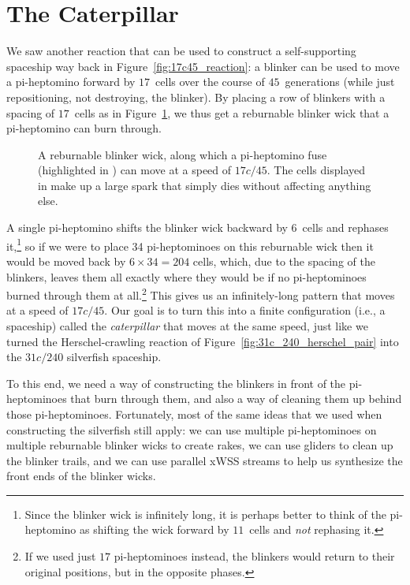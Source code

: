 \section{The Caterpillar}\label{sec:caterpillar}

We saw another reaction that can be used to construct a self-supporting spaceship way back in Figure~\ref{fig:17c45_reaction}: a blinker can be used to move a pi-heptomino forward by $17$~cells over the course of $45$~generations (while just repositioning, not destroying, the blinker). By placing a row of blinkers with a spacing of $17$~cells as in Figure~\ref{fig:reburnable_blinker_wick}, we thus get a reburnable blinker wick that a pi-heptomino can burn through.

\begin{figure}[!htb]
	\centering
	\caption{A reburnable blinker wick, along which a pi-heptomino fuse (highlighted in ) can move at a speed of $17c/45$. The cells displayed in  make up a large spark that simply dies without affecting anything else.}\label{fig:reburnable_blinker_wick}
\end{figure}

A single pi-heptomino shifts the blinker wick backward by $6$~cells and rephases it,\footnote{Since the blinker wick is infinitely long, it is perhaps better to think of the pi-heptomino as shifting the wick forward by $11$~cells and \emph{not} rephasing it.} so if we were to place 34 pi-heptominoes on this reburnable wick then it would be moved back by $6 \times 34 = 204$ cells, which, due to the spacing of the blinkers, leaves them all exactly where they would be if no pi-heptominoes burned through them at all.\footnote{If we used just $17$ pi-heptominoes instead, the blinkers would return to their original positions, but in the opposite phases.} This gives us an infinitely-long pattern that moves at a speed of $17c/45$. Our goal is to turn this into a finite configuration (i.e., a spaceship) called the \emph{caterpillar} that moves at the same speed, just like we turned the Herschel-crawling reaction of Figure~\ref{fig:31c_240_herschel_pair} into the $31c/240$ silverfish spaceship.

To this end, we need a way of constructing the blinkers in front of the pi-heptominoes that burn through them, and also a way of cleaning them up behind those pi-heptominoes. Fortunately, most of the same ideas that we used when constructing the silverfish still apply: we can use multiple pi-heptominoes on multiple reburnable blinker wicks to create rakes, we can use gliders to clean up the blinker trails, and we can use parallel xWSS streams to help us synthesize the front ends of the blinker wicks.

